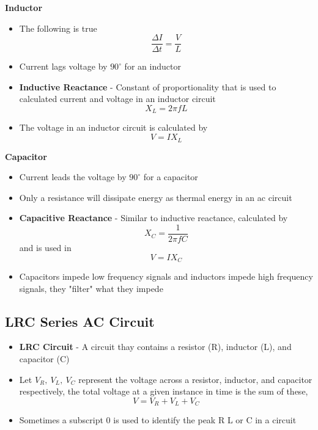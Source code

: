 \textbf{Inductor}
\begin{itemize}
    \item The following is true \[\frac{\Delta I}{\Delta t}=\frac{V}{L}\]
    \item Current lags voltage by \(90^\circ\) for an inductor
    \item \textbf{Inductive Reactance} - Constant of proportionality that is used to calculated current and voltage in an inductor circuit \[X_L=2\pi fL\]
    \item The voltage in an inductor circuit is calculated by \[V=IX_L\]
\end{itemize}

\textbf{Capacitor}
\begin{itemize}
    \item Current leads the voltage by \(90^\circ\) for a capacitor
    \item Only a resistance will dissipate energy as thermal energy in an ac circuit
    \item \textbf{Capacitive Reactance} - Similar to inductive reactance, calculated by \[X_C=\frac{1}{2\pi fC}\] and is used in \[V=IX_C\]
    \item Capacitors impede low frequency signals and inductors impede high frequency signals, they "filter" what they impede
\end{itemize}

\subsection{LRC Series AC Circuit}
\begin{itemize}
    \item \textbf{LRC Circuit} - A circuit thay contains a resistor (R), inductor (L), and capacitor (C)
    \item Let \(V_R,\ V_L,\ V_C\) represent the voltage across a resistor, inductor, and capacitor respectively, the total voltage at a given instance in time is the sum of these, \[V=V_R+V_L+V_C\]
    \item Sometimes a subscript 0 is used to identify the peak R L or C in a circuit
\end{itemize}

